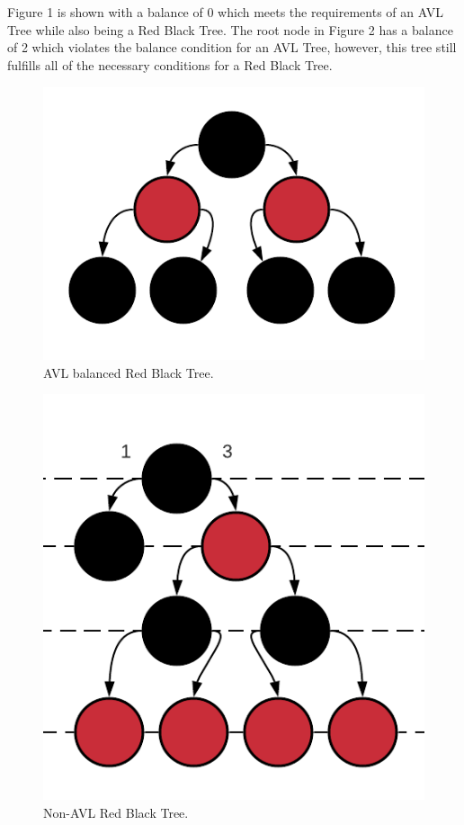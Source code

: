 \documentclass[journal]{IEEEtran}
\begin{document}
\section{}

Figure 1 is shown with a balance of $0$ which meets the requirements of an AVL Tree while also being a Red Black Tree.
The root node in Figure 2 has a balance of 2 which violates the balance condition for an AVL Tree, however, this tree still fulfills 
all of the necessary conditions for a Red Black Tree.

\begin{figure}[h!]
    \includegraphics[scale = 0.5]{p1.png}
    \caption{AVL balanced Red Black Tree.}
\end{figure}
\begin{figure}[h!]
    \includegraphics[scale = 0.5]{p2.png}
    \caption{Non-AVL Red Black Tree.}
\end{figure}
\end{document}
